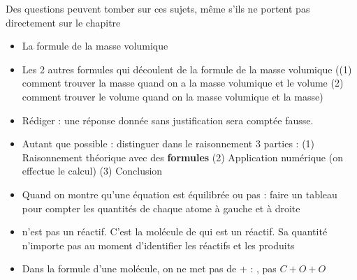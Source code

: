 \documentclass[a4paper,12pt]{article}
\begin{document}
\begin{tcolorbox}[colback=red!10!white, colframe=red!75!black, title=Les choses qui sont considérées comme acquises]
  Des questions peuvent tomber sur ces sujets, même s'ils ne portent pas directement sur le chapitre
  \begin{itemize}[noitemsep]
    \item La formule de la masse volumique 
    \item Les 2 autres formules qui découlent de la formule de la masse volumique ((1) comment trouver la masse quand on a la masse volumique et le volume (2) comment trouver le volume quand on la masse volumique et la masse)
  \end{itemize}
\end{tcolorbox}

\begin{tcolorbox}[colback=red!10!white, colframe=red!75!black, title=Les choses à faire obligatoirement]
  \begin{itemize}[noitemsep]
    \item Rédiger : une réponse donnée sans justification sera comptée fausse.
    \item Autant que possible : distinguer dans le raisonnement 3 parties : (1) Raisonnement théorique avec des \textbf{formules} (2) Application numérique (on effectue le calcul) (3) Conclusion
    \item Quand on montre qu'une équation est équilibrée ou pas : faire un tableau pour compter les quantités de chaque atome à gauche et à droite 
  \end{itemize}
\end{tcolorbox}


\begin{tcolorbox}[colback=gray!10!white, colframe=gray!75!black, title=Les erreurs à ne pas faire]
  \begin{itemize}[noitemsep]
    \item {} n'est pas un réactif. C'est la molécule de  qui est un réactif. Sa quantité n'importe pas au moment d'identifier les réactifs et les produits 
    \item Dans la formule d'une molécule, on ne met pas de + : , pas $C + O + O$
  \end{itemize}
\end{tcolorbox}
\end{document}
